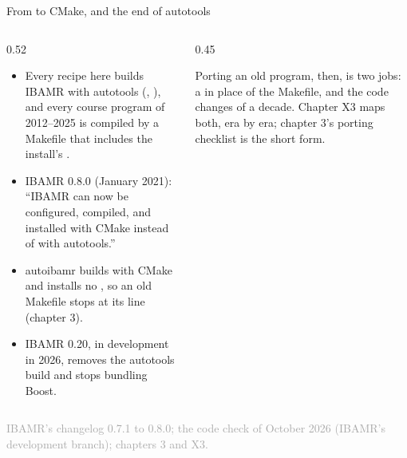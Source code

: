 \documentclass[aspectratio=169,11pt]{beamer}
\newcommand{\sourcecredit}[1]{\vfill\begin{flushright}\tiny\textcolor{DarkGray}{#1}\end{flushright}}
\begin{document}
\begin{frame}{From  to CMake, and the end of autotools}
\label{fr:cmake}
\begin{columns}[T,onlytextwidth]
\begin{column}{0.52\textwidth}
\small
\begin{itemize}\setlength{\itemsep}{4pt}
  \item Every recipe here builds IBAMR with autotools (, ), and every course program of 2012--2025 is compiled by a Makefile that includes the install's .
  \item IBAMR 0.8.0 (January 2021): ``IBAMR can now be configured, compiled, and installed with CMake instead of with autotools.''
  \item autoibamr builds with CMake and installs no , so an old Makefile stops at its  line (chapter 3).
  \item IBAMR 0.20, in development in 2026, removes the autotools build and stops bundling Boost.
\end{itemize}
\end{column}
\begin{column}{0.45\textwidth}
\begin{punchbox}
\small Porting an old program, then, is two jobs: a  in place of the Makefile, and the code changes of a decade. Chapter X3 maps both, era by era; chapter 3's porting checklist is the short form.
\end{punchbox}
\end{column}
\end{columns}
\sourcecredit{IBAMR's changelog 0.7.1 to 0.8.0; the code check of October 2026 (IBAMR's development branch); chapters 3 and X3.}
\end{frame}
\end{document}
